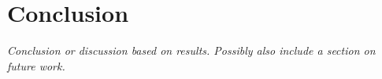 
\chapter{Conclusion}

\textit{Conclusion or discussion based on results.
Possibly also include a section on future work.}

\cleardoublepage